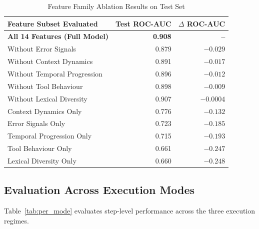 \documentclass[journal,compsoc]{IEEEtran}
\begin{document}
\begin{table}[h]
\centering
\caption{Feature Family Ablation Results on Test Set}
\label{tab:ablation}
\begin{tabular}{@{}lrr@{}}
\toprule
\textbf{Feature Subset Evaluated} & \textbf{Test ROC-AUC} & \textbf{$\Delta$ ROC-AUC} \\ \midrule
\textbf{All 14 Features (Full Model)} & \textbf{0.908} & \textbf{--} \\
Without Error Signals & 0.879 & $-0.029$ \\
Without Context Dynamics & 0.891 & $-0.017$ \\
Without Temporal Progression & 0.896 & $-0.012$ \\
Without Tool Behaviour & 0.898 & $-0.009$ \\
Without Lexical Diversity & 0.907 & $-0.0004$ \\ \midrule
Context Dynamics Only & 0.776 & $-0.132$ \\
Error Signals Only & 0.723 & $-0.185$ \\
Temporal Progression Only & 0.715 & $-0.193$ \\
Tool Behaviour Only & 0.661 & $-0.247$ \\
Lexical Diversity Only & 0.660 & $-0.248$ \\ \bottomrule
\end{tabular}
\end{table}

\subsection{Evaluation Across Execution Modes}
Table~\ref{tab:per_mode} evaluates step-level performance across the three execution regimes.

\begin{table}[h]
\centering
\caption{Step-Level Performance Segmented by Execution Mode}
\label{tab:per_mode}
\end{table}
\end{document}
